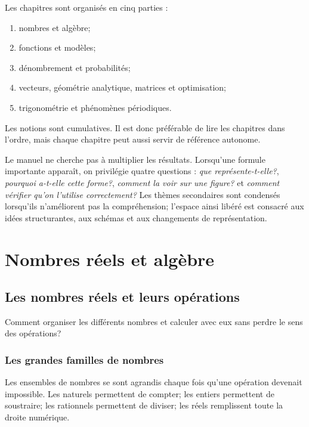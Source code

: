 \documentclass[12pt,a4paper,openany]{book}
\begin{document}
Les chapitres sont organisés en cinq parties :
\begin{enumerate}
  \item nombres et algèbre;
  \item fonctions et modèles;
  \item dénombrement et probabilités;
  \item vecteurs, géométrie analytique, matrices et optimisation;
  \item trigonométrie et phénomènes périodiques.
\end{enumerate}

Les notions sont cumulatives. Il est donc préférable de lire les chapitres dans l'ordre, mais chaque chapitre peut aussi servir de référence autonome.

Le manuel ne cherche pas à multiplier les résultats. Lorsqu'une formule importante apparaît, on privilégie quatre questions : \emph{que représente-t-elle?}, \emph{pourquoi a-t-elle cette forme?}, \emph{comment la voir sur une figure?} et \emph{comment vérifier qu'on l'utilise correctement?} Les thèmes secondaires sont condensés lorsqu'ils n'améliorent pas la compréhension; l'espace ainsi libéré est consacré aux idées structurantes, aux schémas et aux changements de représentation.

\tableofcontents
\mainmatter

\part{Nombres réels et algèbre}

\chapter{Les nombres réels et leurs opérations}

\begin{questionbox}
Comment organiser les différents nombres et calculer avec eux sans perdre le sens des opérations?
\end{questionbox}

\section{Les grandes familles de nombres}

\begin{intuitionbox}
Les ensembles de nombres se sont agrandis chaque fois qu'une opération devenait impossible. Les naturels permettent de compter; les entiers permettent de soustraire; les rationnels permettent de diviser; les réels remplissent toute la droite numérique.
\end{intuitionbox}
\end{document}
